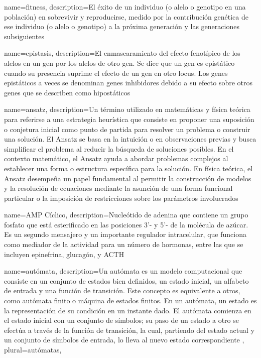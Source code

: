 {
	name=fitness,
	description={El éxito de un individuo (o alelo o genotipo en una población) en sobrevivir y reproducirse, medido por la contribución genética de ese individuo (o alelo o genotipo) a la próxima generación y las generaciones subsiguientes}
}

{
	name=epistasis,
	description={El enmascaramiento del efecto fenotípico de los alelos en un gen por los alelos de otro gen. Se dice que un gen es epistático cuando su presencia suprime el efecto de un gen en otro locus. Los genes epistáticos a veces se denominan genes inhibidores debido a su efecto sobre otros genes que se describen como hipostáticos}
}

{
	name=ansatz,
	description={Un término utilizado en matemáticas y física teórica para referirse a una estrategia heurística que consiste en proponer una suposición o conjetura inicial como punto de partida para resolver un problema o construir una solución. El Ansatz se basa en la intuición o en observaciones previas y busca simplificar el problema al reducir la búsqueda de soluciones posibles. En el contexto matemático, el Ansatz ayuda a abordar problemas complejos al establecer una forma o estructura específica para la solución. En física teórica, el Ansatz desempeña un papel fundamental al permitir la construcción de modelos y la resolución de ecuaciones mediante la asunción de una forma funcional particular o la imposición de restricciones sobre los parámetros involucrados}
}


{
	name=AMP Cíclico,
	description={Nucleótido de adenina que contiene un grupo fosfato que está esterificado en las posiciones 3'- y 5'- de la molécula de azúcar. Es un segundo mensajero y un importante regulador intracelular, que funciona como mediador de la actividad para un número de hormonas, entre las que se incluyen epinefrina, glucagón, y ACTH}
}


{
	name={autómata},
	description={Un autómata es un modelo computacional que consiste en un conjunto de estados bien definidos, un estado inicial, un alfabeto de entrada y una función de transición. Este concepto es equivalente a otros, como autómata finito o máquina de estados finitos. En un autómata, un estado es la representación de su condición en un instante dado. El autómata comienza en el estado inicial con un conjunto de símbolos; su paso de un estado a otro se efectúa a través de la función de transición, la cual, partiendo del estado actual y un conjunto de símbolos de entrada, lo lleva al nuevo estado correspondiente} ,
	plural={autómatas},
	} 
